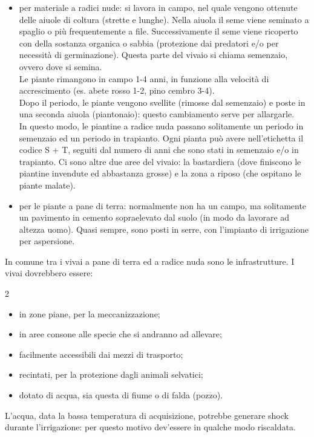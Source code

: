 \begin{itemize}[nosep]
    \item per materiale a radici nude: si lavora in campo, nel quale vengono ottenute delle aiuole di coltura (strette e lunghe). Nella aiuola il seme viene seminato a spaglio o più frequentemente a file. Successivamente il seme viene ricoperto con della sostanza organica o sabbia (protezione dai predatori e/o per necessità di germinazione). Questa parte del vivaio si chiama semenzaio, ovvero dove si semina.\\
    Le piante rimangono in campo 1-4 anni, in funzione alla velocità di accrescimento (es. abete rosso 1-2, pino cembro 3-4).\\
    Dopo il periodo, le piante vengono svellite (rimosse dal semenzaio) e poste in una seconda aiuola (piantonaio): questo cambiamento serve per allargarle.\\
    In questo modo, le piantine a radice nuda passano solitamente un periodo in semenzaio ed un periodo in trapianto. Ogni pianta può avere nell'etichetta il codice S + T, seguiti dal numero di anni che sono stati in semenzaio e/o in trapianto. Ci sono altre due aree del vivaio: la bastardiera (dove finiscono le piantine invendute ed abbastanza grosse) e la zona a riposo (che ospitano le piante malate). 
    \item per le piante a pane di terra: normalmente non ha un campo, ma solitamente un pavimento in cemento sopraelevato dal suolo (in modo da lavorare ad altezza uomo). Quasi sempre, sono posti in serre, con l'impianto di irrigazione per aspersione.
\end{itemize}
In comune tra i vivai a pane di terra ed a radice nuda sono le infrastrutture. I vivai dovrebbero essere:
\begin{multicols}{2} 
\begin{itemize}[nosep]
    \item in zone piane, per la meccanizzazione;
    \item in aree consone alle specie che si andranno ad allevare; 
    \item facilmente accessibili dai mezzi di trasporto;
    \item recintati, per la protezione dagli animali selvatici;
    \item dotato di acqua, sia questa di fiume o di falda (pozzo).
\end{itemize}
\end{multicols}
L'acqua, data la bassa temperatura di acquisizione, potrebbe generare shock durante l'irrigazione: per questo motivo dev'essere in qualche modo riscaldata.\\
